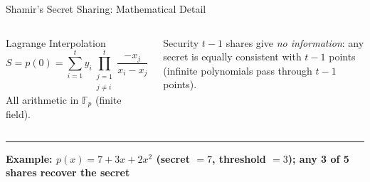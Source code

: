 \documentclass[8pt,aspectratio=169]{beamer}
\newcommand{\bottomnote}[1]{\vfill\vspace{-2mm}\textcolor{mllavender2}{\rule{\textwidth}{0.4pt}}\vspace{1mm}\footnotesize\textbf{#1}}
\begin{document}
\begin{frame}{Shamir's Secret Sharing: Mathematical Detail}
\begin{columns}
\begin{block}{Lagrange Interpolation}
\[
  S = p(0) = \sum_{i=1}^{t} y_i \prod_{\substack{j=1\\j\neq i}}^{t} \frac{-x_j}{x_i - x_j}
\]
All arithmetic in $\mathbb{F}_p$ (finite field).
\end{block}
\vspace{1mm}
\begin{alertblock}{Security}
\small $t\!-\!1$ shares give \emph{no information}: any secret is equally consistent with $t\!-\!1$ points (infinite polynomials pass through $t\!-\!1$ points).
\end{alertblock}
\end{columns}
\bottomnote{Example: $p(x) = 7 + 3x + 2x^2$ (secret $= 7$, threshold $= 3$); any 3 of 5 shares recover the secret}
\end{frame}

\end{document}

